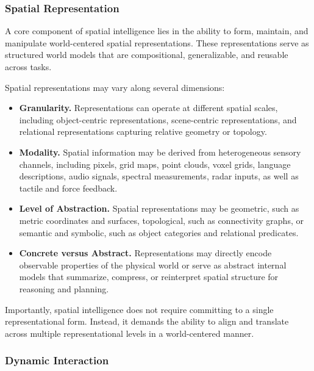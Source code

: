 \subsubsection{Spatial Representation}

A core component of spatial intelligence lies in the ability to form, maintain, and manipulate world-centered spatial representations.
These representations serve as structured world models that are compositional, generalizable, and reusable across tasks.

Spatial representations may vary along several dimensions:
\begin{itemize}[leftmargin=2em,itemsep=0.35em]
    \item \textbf{Granularity.}
    Representations can operate at different spatial scales, including object-centric representations, scene-centric representations, and relational representations capturing relative geometry or topology.
    
    \item \textbf{Modality.}
    Spatial information may be derived from heterogeneous sensory channels, including pixels, grid maps, point clouds, voxel grids, language descriptions, audio signals, spectral measurements, radar inputs, as well as tactile and force feedback.
    
    \item \textbf{Level of Abstraction.}
    Spatial representations may be geometric, such as metric coordinates and surfaces, topological, such as connectivity graphs, or semantic and symbolic, such as object categories and relational predicates.
    
    \item \textbf{Concrete versus Abstract.}
    Representations may directly encode observable properties of the physical world or serve as abstract internal models that summarize, compress, or reinterpret spatial structure for reasoning and planning.
\end{itemize}

Importantly, spatial intelligence does not require committing to a single representational form.
Instead, it demands the ability to align and translate across multiple representational levels in a world-centered manner.



\subsubsection{Dynamic Interaction}

